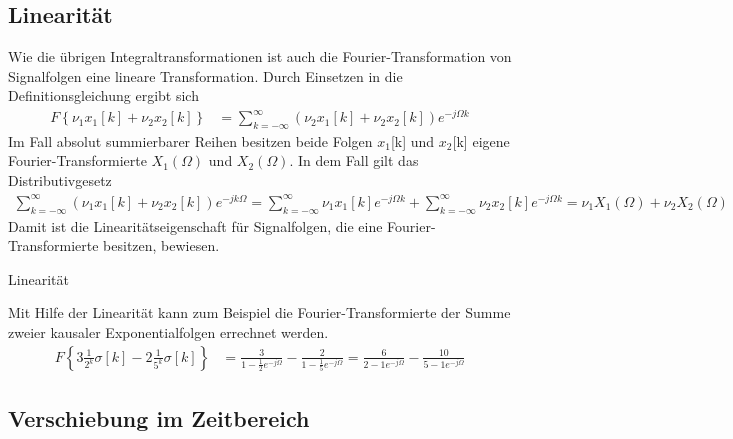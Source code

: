 \subsection{Linearität}\label{sec:linearituxe4t-3}

Wie die übrigen Integraltransformationen ist auch die Fourier-Transformation von Signalfolgen eine lineare Transformation. Durch Einsetzen in die Definitionsgleichung ergibt sich
\begin{align}
F\left\{ \nu_{1}  x_{1}[ k] + \nu_{2}  x_{2}[ k] \right\} &= \sum\limits_{k = - \infty}^{\infty}{\left( \nu_{2}  x_{1}[ k] + \nu_{2}  x_{2}[ k] \right)  e^{- j  \Omega  k}} \label{eq:7.52}
\end{align}
Im Fall absolut summierbarer Reihen besitzen beide Folgen \(x_{1}\){[}k{]} und \(x_{2}\){[}k{]} eigene Fourier-Transformierte \(X_{1}(Ω)\) und \(X_{2}(Ω)\). In dem Fall gilt das Distributivgesetz
\begin{align}
{\sum\limits_{k = - \infty}^{\infty}{\left( \nu_{1}  x_{1}[ k] + \nu_{2}  x_{2}[ k] \right)  e^{- j  k  \Omega}} = \sum\limits_{k = - \infty}^{\infty}{\nu_{1}  x_{1}[ k]  e^{- j  \Omega  k}} + \sum\limits_{k = - \infty}^{\infty}{\nu_{2}  x_{2}[ k]  e^{- j  \Omega  k}}
}{			 = \nu_{1}  X_{1}(\Omega) + \nu_{2}  X_{2}(\Omega)} \label{eq:7.53}
\end{align}
Damit ist die Linearitätseigenschaft für Signalfolgen, die eine Fourier-Transformierte besitzen, bewiesen.

\begin{example}{Linearität}
\label{example:beispiel-linearituxe4t-1}

Mit Hilfe der Linearität kann zum Beispiel die Fourier-Transformierte der Summe zweier kausaler Exponentialfolgen errechnet werden.
\begin{align*}
F\left\{ 3  \frac{1}{2^{k}}  \sigma[ k] - 2  \frac{1}{5^{k}}  \sigma[ k] \right\} &= \frac{3}{1 - \frac{1}{2}  e^{- j  \Omega}} - \frac{2}{1 - \frac{1}{5}  e^{- j  \Omega}} = \frac{6}{2 - 1  e^{- j  \Omega}} - \frac{10}{5 - 1  e^{- j  \Omega}} 
\end{align*}
\end{example}

\subsection{Verschiebung im Zeitbereich}\label{sec:verschiebung-im-zeitbereich}

